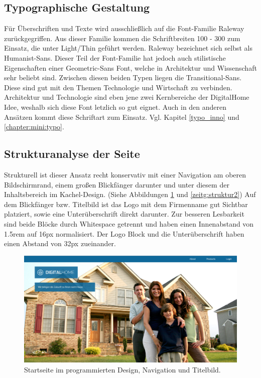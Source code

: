\subsection{Typographische Gestaltung}
\label{typo_zeit}
Für Überschriften und Texte wird ausschließlich auf die Font-Familie Raleway zurückgegriffen. Aus dieser Familie kommen die Schriftbreiten 100 - 300 zum Einsatz, die unter Light/Thin geführt werden. Raleway bezeichnet sich selbst als Humanist-Sans. Dieser Teil der Font-Familie hat jedoch auch stilistische Eigenschaften einer Geometric-Sans Font, welche in Architektur und Wissenschaft sehr beliebt sind. Zwischen diesen beiden Typen liegen die Transitional-Sans. Diese sind gut mit den Themen Technologie und Wirtschaft zu verbinden. Architektur und Technologie sind eben jene zwei Kernbereiche der DigitalHome Idee, weshalb sich diese Font letzlich so gut eignet.
Auch in den anderen Ansätzen kommt diese Schriftart zum Einsatz. Vgl. Kapitel \ref{typo_inno} und \ref{chapter:mini:typo}.

\subsection{Strukturanalyse der Seite}\label{zeitg:struktur}
Strukturell ist dieser Ansatz recht konservativ mit einer Navigation am oberen Bildschirmrand, einem großen Blickfänger darunter und unter diesem der Inhaltsbereich im Kachel-Design. (Siehe Abbildungen \ref{zeitg:struktur1} und \ref{zeitg:struktur2})
Auf dem Blickfänger bzw. Titelbild ist das Logo mit dem Firmenname gut Sichtbar platziert, sowie eine Unterüberschrift direkt darunter. Zur besseren Lesbarkeit sind beide Blöcke durch Whitespace getrennt und haben einen Innenabstand von 1.5rem auf 16px normalisiert. Der Logo Block und die Unterüberschrift haben einen Abstand von 32px zueinander.

\begin{figure} [hp]
	\includegraphics[width=\textwidth]{./img/zeitg_struktur1.png}
	\caption{Startseite im programmierten Design, Navigation und Titelbild.}
	\label{zeitg:struktur1}
\end{figure}

